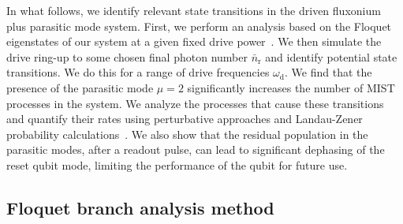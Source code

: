\documentclass[%
reprint,
superscriptaddress,
 amsmath,amssymb,
 aps,
 prx,
longbibliography,
floatfix,
]{revtex4-2}
\begin{document}
In what follows, we identify relevant state transitions in the driven fluxonium plus parasitic mode system. First, we perform an analysis based on the Floquet eigenstates of our system at a given fixed drive power~\cite{khezri2023measurement,cohen2023reminiscence,dumas2024unified}. We then simulate the drive ring-up to some chosen final photon number $\bar{n}_\textrm{r}$ and identify potential state transitions. We do this for a range of drive frequencies $\omega_\textrm{d}$. We find that the presence of the parasitic mode $\mu=2$ significantly increases the number of MIST processes in the system. We analyze the processes that cause these transitions and quantify their rates using perturbative approaches and Landau-Zener probability calculations~\cite{ikeda2022floquet}. We also show that the residual population in the parasitic modes, after a readout pulse, can lead to significant dephasing of the reset qubit mode, limiting the performance of the qubit for future use.

\subsection{Floquet branch analysis method} 
\end{document}
